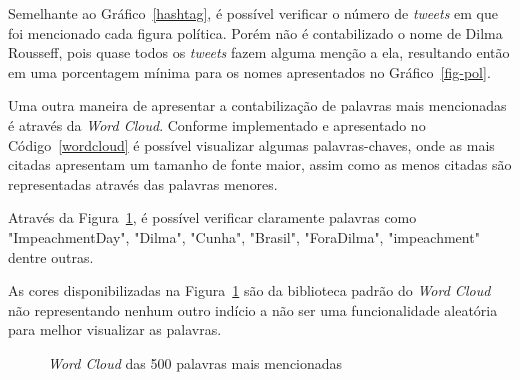 Semelhante ao Gráfico~\ref{hashtag}, é possível verificar o número de \textit{tweets} em que foi mencionado cada figura política. Porém não é contabilizado o nome de Dilma Rousseff, pois quase todos os \textit{tweets} fazem alguma menção a ela, resultando então em uma porcentagem mínima para os nomes apresentados no Gráfico~\ref{fig-pol}.

Uma outra maneira de apresentar a contabilização de palavras mais mencionadas é através da \textit{Word Cloud}. Conforme implementado e apresentado no Código~\ref{wordcloud} é possível visualizar algumas palavras-chaves, onde as mais citadas apresentam um tamanho de fonte maior, assim como as menos citadas são representadas através das palavras menores.

Através da Figura~\ref{fig:wordcloud}, é possível verificar claramente palavras como "ImpeachmentDay", "Dilma", "Cunha", "Brasil", "ForaDilma", "impeachment" dentre outras.

As cores disponibilizadas na Figura~\ref{fig:wordcloud} são da biblioteca padrão do \textit{Word Cloud} não representando nenhum outro indício a não ser uma funcionalidade aleatória para melhor visualizar as palavras.

\begin{figure}[h]
	\centering
    \vspace{-0.2cm}
	\caption{\textit{Word Cloud} das 500 palavras mais mencionadas}
	\label{fig:wordcloud}
\end{figure}

